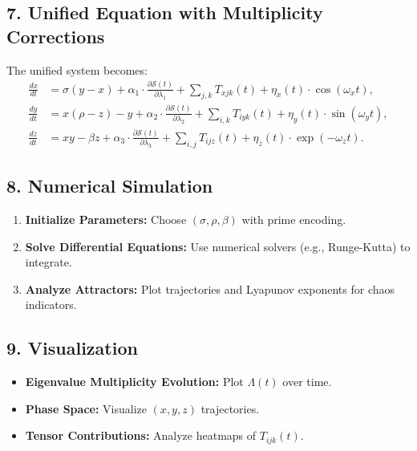 \documentclass{article}
\theoremstyle{plain}
\begin{document}
\subsection*{7. Unified Equation with Multiplicity Corrections}
The unified system becomes:
\begin{align}
\frac{dx}{dt} &= \sigma(y - x) + \alpha_1 \cdot \frac{\partial \mathcal{S}(t)}{\partial \lambda_1} + \sum_{j,k} T_{xjk}(t) + \eta_x(t) \cdot \cos(\omega_x t), \\
\frac{dy}{dt} &= x(\rho - z) - y + \alpha_2 \cdot \frac{\partial \mathcal{S}(t)}{\partial \lambda_2} + \sum_{i,k} T_{iyk}(t) + \eta_y(t) \cdot \sin(\omega_y t), \\
\frac{dz}{dt} &= xy - \beta z + \alpha_3 \cdot \frac{\partial \mathcal{S}(t)}{\partial \lambda_3} + \sum_{i,j} T_{ijz}(t) + \eta_z(t) \cdot \exp(-\omega_z t).
\end{align}

\subsection*{8. Numerical Simulation}
\begin{enumerate}
    \item \textbf{Initialize Parameters:} Choose $(\sigma, \rho, \beta)$ with prime encoding.
    \item \textbf{Solve Differential Equations:} Use numerical solvers (e.g., Runge-Kutta) to integrate.
    \item \textbf{Analyze Attractors:} Plot trajectories and Lyapunov exponents for chaos indicators.
\end{enumerate}

\subsection*{9. Visualization}
\begin{itemize}
    \item \textbf{Eigenvalue Multiplicity Evolution:} Plot $\Lambda(t)$ over time.
    \item \textbf{Phase Space:} Visualize $(x, y, z)$ trajectories.
    \item \textbf{Tensor Contributions:} Analyze heatmaps of $T_{ijk}(t)$.
\end{itemize}



\end{document}
